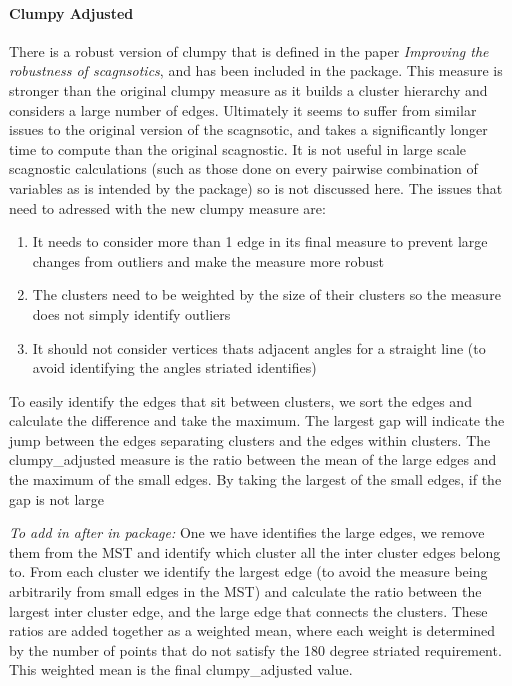 \hypertarget{clumpy-adjusted}{%
\paragraph{Clumpy Adjusted}\label{clumpy-adjusted}}

There is a robust version of clumpy that is defined in the paper
\emph{Improving the robustness of scagnsotics}, and has been included in
the package. This measure is stronger than the original clumpy measure
as it builds a cluster hierarchy and considers a large number of edges.
Ultimately it seems to suffer from similar issues to the original
version of the scagnsotic, and takes a significantly longer time to
compute than the original scagnostic. It is not useful in large scale
scagnostic calculations (such as those done on every pairwise
combination of variables as is intended by the package) so is not
discussed here. The issues that need to adressed with the new clumpy
measure are:

\begin{enumerate}
\def\labelenumi{\arabic{enumi}.}
\item
  It needs to consider more than 1 edge in its final measure to prevent
  large changes from outliers and make the measure more robust
\item
  The clusters need to be weighted by the size of their clusters so the
  measure does not simply identify outliers
\item
  It should not consider vertices thats adjacent angles for a straight
  line (to avoid identifying the angles striated identifies)
\end{enumerate}

To easily identify the edges that sit between clusters, we sort the
edges and calculate the difference and take the maximum. The largest gap
will indicate the jump between the edges separating clusters and the
edges within clusters. The clumpy\_adjusted measure is the ratio between
the mean of the large edges and the maximum of the small edges. By
taking the largest of the small edges, if the gap is not large

\emph{To add in after in package:} One we have identifies the large
edges, we remove them from the MST and identify which cluster all the
inter cluster edges belong to. From each cluster we identify the largest
edge (to avoid the measure being arbitrarily from small edges in the
MST) and calculate the ratio between the largest inter cluster edge, and
the large edge that connects the clusters. These ratios are added
together as a weighted mean, where each weight is determined by the
number of points that do not satisfy the 180 degree striated
requirement. This weighted mean is the final clumpy\_adjusted value.

